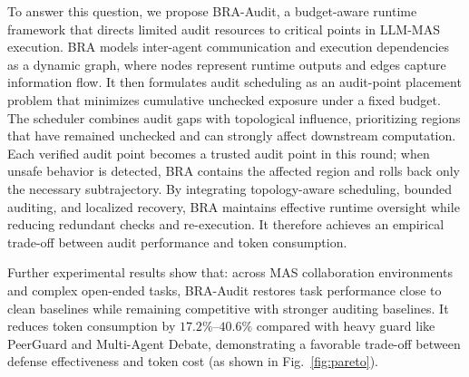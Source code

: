 \documentclass[letterpaper]{article} %
\begin{document}
To answer this  question, we propose BRA-Audit, a budget-aware runtime
framework that directs limited audit resources to critical points in LLM-MAS execution. BRA models inter-agent communication and execution dependencies as a dynamic graph, where nodes represent runtime outputs and edges capture information flow. It then formulates audit scheduling as an audit-point placement problem that minimizes cumulative unchecked exposure under a fixed budget. The scheduler combines audit gaps with topological influence, prioritizing regions that have remained unchecked and can strongly affect downstream computation. Each verified audit point becomes a trusted audit point in this round; when unsafe behavior is detected, BRA contains the affected region and rolls back only the necessary subtrajectory. By integrating topology-aware scheduling, bounded auditing, and localized recovery, BRA maintains effective runtime oversight while reducing redundant checks and re-execution. It therefore achieves an empirical trade-off between audit performance and token consumption.

Further experimental results show that: across MAS collaboration environments and complex open-ended tasks, BRA-Audit restores task performance close to clean baselines while remaining competitive with stronger auditing baselines. It reduces
token consumption by \(17.2\%\)--\(40.6\%\) compared with heavy guard like PeerGuard and Multi-Agent Debate, demonstrating a favorable trade-off between defense effectiveness and token cost (as shown in Fig.~\ref{fig:pareto}).
\end{document}

